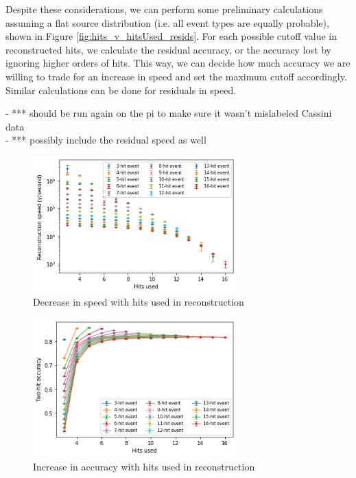 Despite these considerations, we can perform some preliminary calculations assuming a flat source distribution (i.e. all event types are equally probable), shown in Figure \ref{fig:hits_v_hitsUsed_resids}. For each possible cutoff value in reconstructed hits, we calculate the residual accuracy, or the accuracy lost by ignoring higher orders of hits. This way, we can decide how much accuracy we are willing to trade for an increase in speed and set the maximum cutoff accordingly. Similar calculations can be done for residuals in speed.

- *** should be run again on the pi to make sure it wasn't mislabeled Cassini data\\
- *** possibly include the residual speed as well

\begin{figure}
    \centering
    \includegraphics[width=0.7\textwidth]{graphs/pi_hits_v_hitsUsed_speed.png}
    \caption{Decrease in speed with hits used in reconstruction}
    \label{fig:hits_v_hitsUsed_speed}
\end{figure}

\begin{figure}
    \centering
    \includegraphics[width=0.7\textwidth]{graphs/pi_hits_v_hitsUsed_accuracy.png}
    \caption{Increase in accuracy with hits used in reconstruction}
    \label{fig:hits_v_hitsUsed_acc}
\end{figure}

